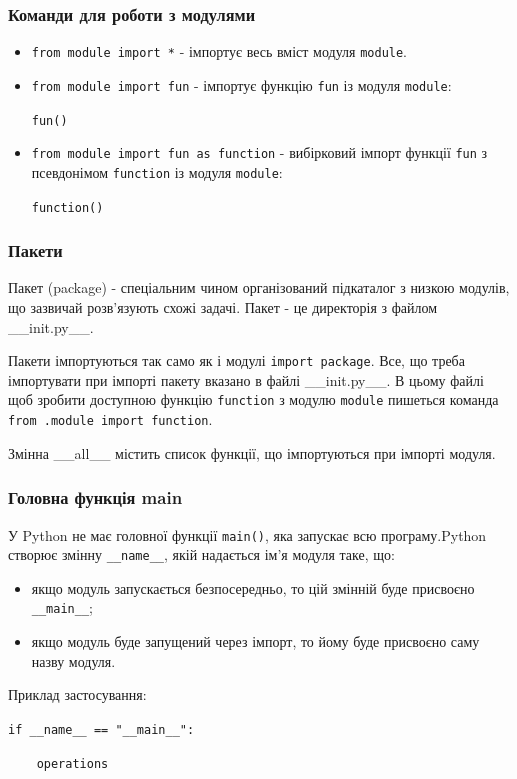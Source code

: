 \begin{frame}
\frametitle{Команди для роботи з модулями}
\begin{itemize}
  \item<1-> \texttt{from module import *} - імпортує весь вміст модуля \texttt{module}.
  \item<2-> \texttt{from module import fun} - імпортує функцію \texttt{fun} із модуля \texttt{module}:
   \begin{center}
  \texttt{fun()}
  \end{center} 
  \item<3-> \texttt{from module import fun as function} - вибірковий імпорт функції \texttt{fun} з псевдонімом \texttt{function} із модуля \texttt{module}:
  \begin{center}
  \texttt{function()}
  \end{center}
\end{itemize}
\end{frame}

\begin{frame}
\frametitle{Пакети}
Пакет (package) - спеціальним чином організований підкаталог з низкою модулів, що зазвичай розв'язують схожі задачі. Пакет - це директорія з файлом \_\_init.py\_\_.

Пакети імпортуються так само як і модулі \texttt{import package}. Все, що треба імпортувати при імпорті пакету вказано в файлі \_\_init.py\_\_. В цьому файлі щоб зробити доступною функцію \texttt{function} з модулю \texttt{module}  пишеться команда \texttt{from .module import function}.

Змінна \_\_all\_\_ містить список функції, що імпортуються при імпорті модуля.
\end{frame}

\begin{frame}
\frametitle{Головна функція main}
У Python не має головної функції \texttt{main()}, яка запускає всю програму.Python створює змінну \texttt{\_\_name\_\_}, якій надається ім'я модуля таке, що:
\begin{itemize}
  \item якщо модуль запускається безпосередньо, то цій змінній буде присвоєно \texttt{\_\_main\_\_};
  \item якщо модуль буде запущений через імпорт, то йому буде присвоєно саму назву модуля.
\end{itemize}
 
 Приклад застосування:

\texttt{if \_\_name\_\_ == "\_\_main\_\_":}

\texttt{~~~~operations }
\end{frame}


